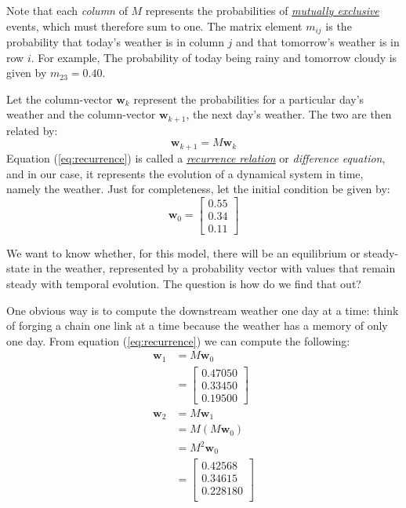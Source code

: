 \documentclass[
  12pt,
  a4paper,
]{article}
\begin{document}
Note that each \emph{column} of \(M\) represents the probabilities of
\href{https://en.wikipedia.org/wiki/Mutual_exclusivity}{\emph{mutually
exclusive}} events, which must therefore sum to one. The matrix element
\(m_{ij}\) is the probability that today's weather is in column \(j\)
and that tomorrow's weather is in row \(i\). For example, The
probability of today being rainy and tomorrow cloudy is given by
\(m_{23} = 0.40\).

Let the column-vector \(\symbf{w}_{k}\) represent the probabilities for
a particular day's weather and the column-vector \(\symbf{ w}_{k+1}\),
the next day's weather. The two are then related by: \begin{equation}
\symbf{w}_{k+1} = M\symbf{w}_{k}
\label{eq:recurrence}\end{equation} Equation (\ref{eq:recurrence}) is
called a
\href{https://en.wikipedia.org/wiki/Recurrence_relation}{\emph{recurrence
relation}} or \emph{difference equation}, and in our case, it represents
the evolution of a dynamical system in time, namely the weather. Just
for completeness, let the initial condition be given by:
\begin{equation}
\symbf{w}_{0} = \begin{bmatrix}0.55\\0.34\\0.11\end{bmatrix}
\label{eq:initial}\end{equation}

We want to know whether, for this model, there will be an equilibrium or
steady-state in the weather, represented by a probability vector with
values that remain steady with temporal evolution. The question is how
do we find that out?

One obvious way is to compute the downstream weather one day at a time:
think of forging a chain one link at a time because the weather has a
memory of only one day. From equation (\ref{eq:recurrence}) we can
compute the following: \[
\begin{aligned}
\symbf{w}_{1} &= M\symbf {w}_{0}\\
&= \begin{bmatrix}0.47050\\ 0.33450\\0.19500\end{bmatrix}\\
\symbf{w}_{2} &= M\symbf{w}_{1}\\
&= M(M\symbf{w}_{0})\\
&= M^{2}\symbf{w}_{0}\\
&= \begin{bmatrix}0.42568\\0.34615\\0.228180\\\end{bmatrix}
\end{aligned}
\]
\end{document}
